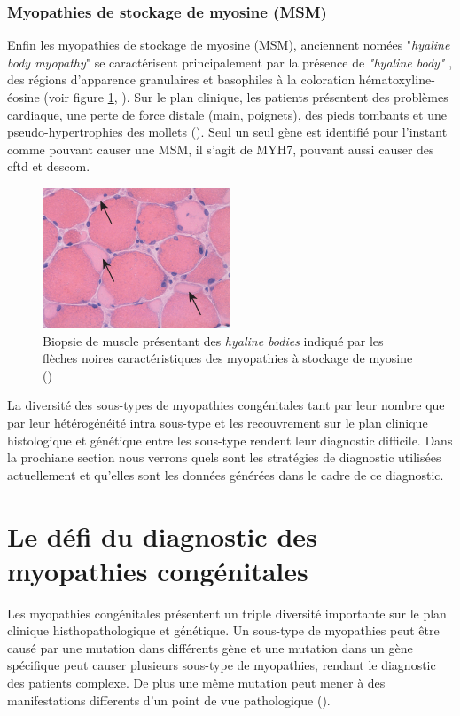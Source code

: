 \subsubsection{Myopathies de stockage de myosine (MSM)}
Enfin les myopathies de stockage de myosine (MSM), anciennent nomées "\textit{hyaline body myopathy}" se caractérisent principalement  par la présence de \textit{"hyaline body"} , des régions d'apparence granulaires et basophiles à la coloration hématoxyline-éosine (voir figure \ref{fig:hyaline}, \cite{claeys_congenital_2020, victor_dubowitz_muscle_2020}).  Sur le plan clinique, les patients présentent des problèmes cardiaque, une perte de force distale (main, poignets), des pieds tombants et une pseudo-hypertrophies des mollets (\cite{cassandrini_congenital_2017}). Seul un seul gène est identifié pour l'instant comme pouvant causer une MSM, il s'agit de MYH7, pouvant aussi causer des \gls{cftd} et des\gls{com}.
\begin{figure}[!ht]
 \centering
 \includegraphics[width=0.5\textwidth]{figures/hyalin.jpg}
 \caption[Biopsie de muscle des \textit{hyaline bodies}]{Biopsie de muscle présentant des \textit{hyaline bodies} indiqué par les flèches noires caractéristiques des myopathies à stockage de myosine (\cite{victor_dubowitz_muscle_2020})}
 \label{fig:hyaline}
\end{figure}

La diversité des sous-types de myopathies congénitales tant par leur nombre que par leur hétérogénéité intra sous-type et les recouvrement sur le plan clinique histologique et génétique entre les sous-type rendent leur diagnostic difficile. Dans la prochiane section nous verrons quels sont les stratégies de diagnostic utilisées actuellement et qu'elles sont les données générées dans le cadre de ce diagnostic.

\section{Le défi du diagnostic des myopathies congénitales}
Les myopathies congénitales présentent un triple diversité importante sur le plan clinique histhopathologique et génétique. Un sous-type de myopathies peut être causé par une mutation dans différents gène et une mutation dans un gène spécifique peut causer plusieurs sous-type de myopathies, rendant le diagnostic des patients complexe. De plus une même mutation peut mener à des manifestations differents d'un point de vue pathologique (\cite{north_approach_2014}). 

